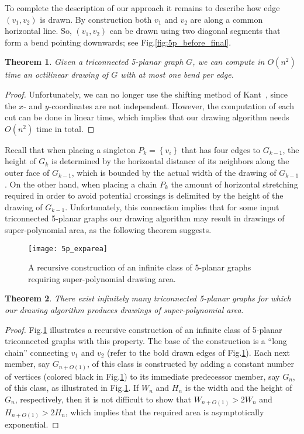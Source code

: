 \documentclass[a4paper,twoside,11pt]{article}
\newtheorem{theorem}{Theorem}
\begin{document}
To complete the description of our approach it remains to describe
how edge $(v_1,v_2)$ is drawn. By construction both $v_1$ and $v_2$
are along a common horizontal line. So, $(v_1,v_2)$ can be drawn
using two diagonal segments that form a bend pointing downwards; see
Fig.\ref{fig:5p_before_final}.

\begin{theorem}
Given a triconnected 5-planar graph $G$, we can compute in $O(n^2)$
time an octilinear drawing of $G$ with at most one bend per edge.
\end{theorem}
\begin{proof}
Unfortunately, we can no longer use the shifting method of
Kant~\cite{Kant92b}, since the $x$- and $y$-coordinates are not
independent. However, the computation of each cut can be done in
linear time, which implies that our drawing algorithm needs $O(n^2)$
time in total.
\end{proof}

Recall that when placing a singleton $P_k = \left\{v_i\right\}$ that
has four edges to $G_{k-1}$, the height of $G_k$ is determined by
the horizontal distance of its neighbors along the outer face of
$G_{k-1}$, which is bounded by the actual width of the drawing of
$G_{k-1}$. On the other hand, when placing a chain $P_k$ the amount
of horizontal stretching required in order to avoid potential
crossings is delimited by the height of the drawing of $G_{k-1}$.
Unfortunately, this connection implies that for some input
triconnected 5-planar graphs our drawing algorithm may result in
drawings of super-polynomial area, as the following theorem
suggests.

\begin{figure}[t]
    \centering
    \texttt{[image: 5p\_exparea]}
    \caption{A recursive construction of an infinite class of 5-planar graphs requiring super-polynomial drawing area.}
    \label{fig:5p_exparea}
\end{figure}

\begin{theorem}
There exist infinitely many triconnected 5-planar graphs for which
our drawing algorithm produces drawings of super-polynomial area.
\label{thm:5planarExp}
\end{theorem}
\begin{proof}
Fig.\ref{fig:5p_exparea} illustrates a recursive construction of an
infinite class of 5-planar triconnected graphs with this property.
The base of the construction is a ``long chain'' connecting $v_1$
and $v_2$ (refer to the bold drawn edges of
Fig.\ref{fig:5p_exparea}). Each next member, say $G_{n+O(1)}$, of
this class is constructed by adding a constant number of vertices
(colored black in Fig.\ref{fig:5p_exparea}) to its immediate
predecessor member, say $G_{n}$, of this class, as illustrated in
Fig.\ref{fig:5p_exparea}. If $W_n$ and $H_n$ is the width and the
height of $G_n$, respectively, then it is not difficult to show that
$W_{n+O(1)}>2W_{n}$ and $H_{n+O(1)}>2H_{n}$, which implies that the
required area is asymptotically exponential.
\end{proof}
\end{document}

